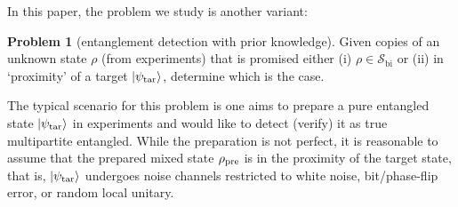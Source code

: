 \documentclass[
aps,
pra,
twocolumn,
floatfix,
]{revtex4-2}
\theoremstyle{plain}
\theoremstyle{definition}
\newtheorem{problem}{Problem}
\newcommand{\dm}{\rho}
\newcommand{\bi}{\text{bi}}
\newcommand{\target}{\textup{tar}}
\newcommand{\prepare}{\textup{pre}}
\newcommand{\separableset}{\mathcal{S}}
\newcommand{\ppartition}{\mathcal{P}}
\begin{document}
In this paper, the problem we study is another variant:
\begin{problem}[entanglement detection with prior knowledge]\label{prm:entanglement_detection}
	Given copies of an unknown state $\dm$ (from experiments) that is promised either (i) $\dm\in\separableset_{\bi}$
	or (ii) in `proximity' of a target $\ket{\psi_{\target}}$,
	determine which is the case.
\end{problem}
The typical scenario for this problem is one aims to prepare a pure entangled state $\ket{\psi_\target}$ in experiments and would like to detect (verify) it as true multipartite entangled. 
While the preparation is not perfect, 
it is reasonable to assume that the prepared mixed state $\dm_{\prepare}$ is in the proximity of the target state,
that is, $\ket{\psi_{\target}}$ undergoes noise channels restricted to white noise, bit/phase-flip error, or random local unitary.
\end{document}
